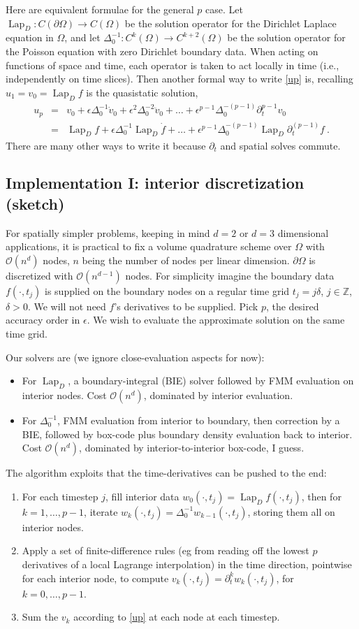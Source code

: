 \documentclass[10pt]{article}
\newcommand{\bi}{\begin{itemize}}
\newcommand{\ei}{\end{itemize}}
\newcommand{\ben}{\begin{enumerate}}
\newcommand{\een}{\end{enumerate}}
\newcommand{\bea}{\begin{eqnarray}}
\newcommand{\eea}{\end{eqnarray}}
\newcommand{\Z}{\mathbb{Z}}
\newcommand{\bigO}{{\mathcal O}}
\newcommand{\pO}{{\partial\Omega}}
\newcommand{\eps}{\epsilon}
\newcommand{\dt}{\partial_t}
\DeclareMathOperator{\Lap}{Lap}
\begin{document}
Here are equivalent formulae for the general $p$ case.
Let $\Lap_D: C(\pO) \to C(\Omega)$ be the solution operator for the Dirichlet
Laplace equation in $\Omega$, and let $\Delta_0^{-1} : C^k(\Omega) \to
C^{k+2}(\Omega)$ be the solution operator for the Poisson equation with
zero Dirichlet boundary data. When acting on functions of
space and time, each operator is taken to act locally in time
(i.e., independently on time slices).
Then another formal way to write \eqref{up} is, recalling $u_1=v_0=\Lap_D f$ is
the quasistatic solution,
\bea
u_p &=& v_0 + \eps \Delta_0^{-1} \dot v_0 + \eps^2 \Delta_0^{-2} \ddot v_0 +
\dots + \eps^{p-1} \Delta_0^{-(p-1)} \dt^{p-1} v_0
\\
&=&
\Lap_D f + \eps \Delta_0^{-1} \Lap_D \dot f + \ldots
+ \eps^{p-1} \Delta_0^{-(p-1)} \Lap_D \dt^{(p-1)} f
~.
\label{upformal}
\eea
There are many other ways to write it because $\dt$ and spatial solves
commute.


\subsection{Implementation I: interior discretization (sketch)}

For spatially simpler problems,
keeping in mind $d=2$ or $d=3$ dimensional applications,
it is practical to fix a
volume quadrature scheme over $\Omega$ with $\bigO(n^d)$ nodes,
$n$ being the number of nodes per linear dimension.
$\pO$ is discretized with $\bigO(n^{d-1})$ nodes.
For simplicity imagine the boundary data $f(\cdot,t_j)$ is supplied on the boundary nodes on a regular time grid $t_j=j\delta$, $j\in\Z$, $\delta>0$.
We will not need $f$'s derivatives to be supplied.
Pick $p$, the desired accuracy order in $\eps$.
We wish to evaluate the approximate solution on the same time grid.

Our solvers are (we ignore close-evaluation aspects for now):
\bi
\item
  For $\Lap_D$, a boundary-integral (BIE) solver followed by FMM evaluation on
  interior nodes. Cost $\bigO(n^d)$, dominated by interior evaluation.
\item
  For $\Delta_0^{-1}$, FMM evaluation from interior to boundary,
  then correction by a BIE, followed by box-code plus boundary density
  evaluation back to interior.
  Cost $\bigO(n^d)$, dominated by interior-to-interior box-code, I guess.
\ei

The algorithm exploits that the time-derivatives can be pushed to the end:
\ben
\item
  For each timestep $j$, fill interior data $w_0(\cdot,t_j)=\Lap_D f(\cdot,t_j)$,
  then for $k=1,\ldots,p-1$,
  iterate $w_k(\cdot,t_j)=\Delta_0^{-1} w_{k-1}(\cdot,t_j)$, storing them all
  on interior nodes.
\item
  Apply a set of finite-difference rules (eg from reading off the lowest $p$ derivatives of a local Lagrange interpolation)
  in the time direction, pointwise for each interior node,
  to compute
  $v_k(\cdot,t_j) = \dt^k w_k(\cdot,t_j)$, for $k=0,\ldots,p-1$.
\item
  Sum the $v_k$ according to \eqref{up} at each node at each timestep.
\een
\end{document}

